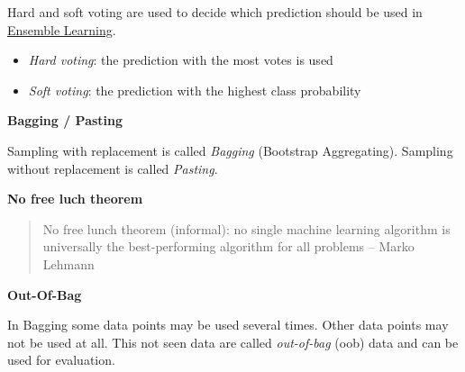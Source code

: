 \documentclass[11pt,twoside,landscape]{article}
\begin{document}
\begin{multicols}{3}
Hard and soft voting are used to decide which prediction should be used in \href{../../../roam/20211228090232-ensemble_learning.org}{Ensemble Learning}.
\begin{itemize}
\item \emph{Hard voting}: the prediction with the most votes is used
\item \emph{Soft voting}: the prediction with the highest class probability
\end{itemize}


\textbf{Bagging / Pasting}

Sampling with replacement is called \emph{Bagging} (Bootstrap Aggregating).
Sampling without replacement is called \emph{Pasting}.


\textbf{No free luch theorem}

\begin{quote}
No free lunch theorem (informal): no single machine learning algorithm is universally the best-performing algorithm for all problems
-- Marko Lehmann
\end{quote}


\textbf{Out-Of-Bag}

In Bagging some data points may be used several times.
Other data points may not be used at all.
This not seen data are called \emph{out-of-bag} (oob) data and can be used for evaluation.

\end{multicols}
\end{document}
